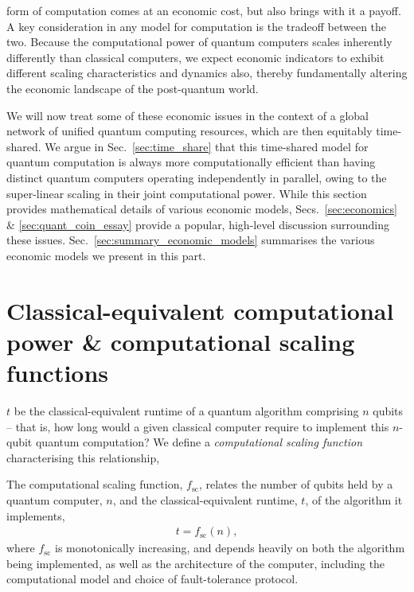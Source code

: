 %
%

 form of computation comes at an economic cost, but also brings with it a payoff. A key consideration in any model for computation is the tradeoff between the two. Because the computational power of quantum computers scales inherently differently than classical computers, we expect economic indicators to exhibit different scaling characteristics and dynamics also, thereby fundamentally altering the economic landscape of the post-quantum world.

We will now treat some of these economic issues in the context of a global network of unified quantum computing resources, which are then equitably time-shared. We argue in Sec.~\ref{sec:time_share} that this time-shared model for quantum computation is always more computationally efficient than having distinct quantum computers operating independently in parallel, owing to the super-linear scaling in their joint computational power. While this section provides mathematical details of various economic models, Secs.~\ref{sec:economics} \& \ref{sec:quant_coin_essay} provide a popular, high-level discussion surrounding these issues. Sec.~\ref{sec:summary_economic_models} summarises the various economic models we present in this part.

%
%

\section{Classical-equivalent computational power \& computational scaling functions}\label{sec:comp_sc_func}

 $t$ be the classical-equivalent runtime of a quantum algorithm comprising $n$ qubits -- that is, how long would a given classical computer require to implement this $n$-qubit quantum computation? We define a \textit{computational scaling function} characterising this relationship,

\begin{definition} \label{def:scaling_func} 
The computational scaling function, $f_\mathrm{sc}$, relates the number of qubits held by a quantum computer, $n$, and the classical-equivalent runtime, $t$, of the algorithm it implements,
\begin{align}
t = f_\mathrm{sc}(n),
\end{align}
	where $f_\mathrm{sc}$ is monotonically increasing, and depends heavily on both the algorithm being implemented, as well as the architecture of the computer, including the computational model and choice of fault-tolerance protocol.
\end{definition}

